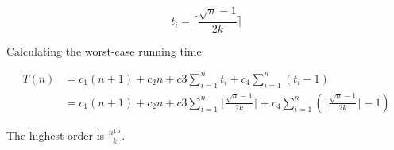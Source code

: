 \documentclass[10pt]{article}
\begin{document}
\newcommand{\ceil}[1]{\lceil {#1} \rceil}

\[t_i = \ceil{\frac{\sqrt{n}-1}{2k}}\]

Calculating the worst-case running time:

\begin{align*}T(n) & = c_1(n+1) + c_2n + c3\sum_{i=1}^n t_i + c_4\sum_{i=1}^n (t_i - 1)                                                   \\
                   & = c_1(n+1) + c_2n + c3\sum_{i=1}^n \ceil{\frac{\sqrt{n}-1}{2k}} + c_4\sum_{i=1}^n (\ceil{\frac{\sqrt{n}-1}{2k}} - 1)
\end{align*}

The highest order is $\frac{n^{1.5}}{k}$.
\end{document}
